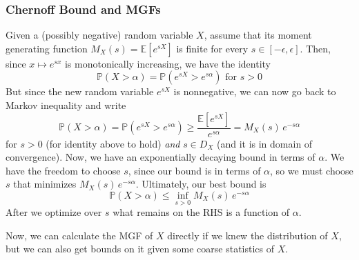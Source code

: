   \subsubsection{Chernoff Bound and MGFs}

    \begin{theorem}
      Given a (possibly negative) random variable $X$, assume that its moment generating function $M_X (s) = \mathbb{E}[e^{s X}]$ is finite for every $s \in [-\epsilon, \epsilon]$. Then, since $x \mapsto e^{s x}$ is monotonically increasing, we have the identity 
      \begin{equation}
        \mathbb{P}(X > \alpha) = \mathbb{P}(e^{s X} > e^{s \alpha}) \text{ for } s > 0
      \end{equation}
      But since the new random variable $e^{s X}$ is nonnegative, we can now go back to Markov inequality and write 
      \begin{equation}
        \mathbb{P}(X > \alpha) = \mathbb{P}(e^{s X} > e^{s \alpha}) \geq \frac{\mathbb{E}[e^{s X}]}{e^{s \alpha}} = M_X (s) \, e^{-s \alpha}
      \end{equation}
      for $s > 0$ (for identity above to hold) \textit{and} $s \in D_X$ (and it is in domain of convergence). Now, we have an exponentially decaying bound in terms of $\alpha$. We have the freedom to choose $s$, since our bound is in terms of $\alpha$, so we must choose $s$ that minimizes $M_X (s) \, e^{-s \alpha}$. Ultimately, our best bound is 
      \begin{equation}
        \mathbb{P}(X > \alpha) \leq \inf_{s > 0} M_X (s) \, e^{-s \alpha}
      \end{equation}
      After we optimize over $s$ what remains on the RHS is a function of $\alpha$. 
    \end{theorem}

    Now, we can calculate the MGF of $X$ directly if we knew the distribution of $X$, but we can also get bounds on it given some coarse statistics of $X$. 

